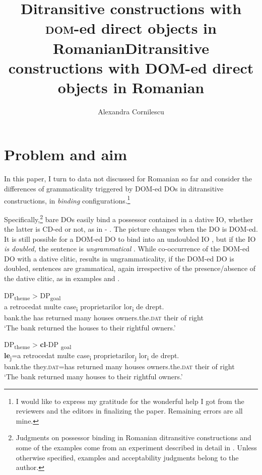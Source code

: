 \documentclass[output=paper,colorlinks,citecolor=brown,nonflat]{langsci/langscibook}
\author{Alexandra Cornilescu\affiliation{University of Bucharest}}
\title{Ditransitive constructions with \textsc{dom}-ed direct objects in Romanian}
\title{Ditransitive constructions with DOM-ed direct objects in Romanian}
\begin{document}
\maketitle


\section{Problem and aim} %

In this paper, I turn to data not discussed for Romanian so far and consider the differences of grammaticality triggered by DOM-ed DOs in ditransitive constructions, in \textit{binding} configurations.\footnote{I would like to express my gratitude for the wonderful help I got from the reviewers and the editors in finalizing the paper. Remaining errors are all mine.}

Specifically,\footnote{Judgments on possessor binding in Romanian ditransitive constructions and some of the examples come from an experiment described in detail in \citep{CornilescuDinuTigău2017Dative}. Unless otherwise specified, examples and acceptability judgments belong to the author.} bare DOs easily bind a possessor contained in a dative IO, whether the latter is CD-ed or not, as in  - . The picture changes when the DO is DOM-ed. It is still possible for a DOM-ed DO to bind into an undoubled IO , but if the IO \textit{is doubled,} the sentence is \textit{ungrammatical} . While co-occurrence of the DOM-ed DO with a dative clitic, results in ungrammaticality, if the DOM-ed \textsc{DO} is doubled, sentences are grammatical, again irrespective of the presence/absence of the dative clitic, as in examples  and .

\ea \label{ex:cornilescu:1} DP\textsubscript{theme} > DP\textsubscript{goal}\\ %
          {a} {retrocedat}  {multe} {case\textsubscript{i}}  {proprietarilor}   {lor\textsubscript{i}}  {de} {drept}.\\
bank.the has returned  many houses  owners.the.\textsc{dat} their of right\\
        \glt ‘The bank returned the houses to their rightful owners.’ \citep[162]{CornilescuDinuTigău2017DOC}
\z


\ea %
    \label{ex:cornilescu:2}
    DP\textsubscript{theme} > \textbf{cl}-DP \textsubscript{goal}\\
     \textbf{{le}}{\textsubscript{j}}{=a} {retrocedat} {multe} {case\textsubscript{i}} {proprietarilor\textsubscript{j}} {lor\textsubscript{i}} {de} {drept}.\\
        bank.the they.\textsc{dat}=has returned many houses owners.the.\textsc{dat} their of right\\
    \glt ‘The bank returned many houses to their rightful owners.’ \citep[162]{CornilescuDinuTigău2017DOC}
    \z
\end{document}
